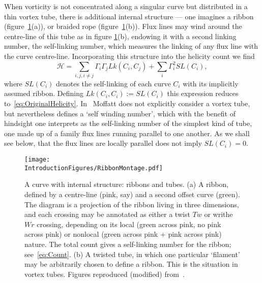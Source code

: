 When vorticity is not concentrated along a singular curve but distributed in a thin vortex tube, there is additional internal structure --- one imagines a ribbon (figure~\ref{fig:RibbonMontage}(a)), or braided rope (figure~\ref{fig:RibbonMontage}(b)). Flux lines may wind around the centre-line of this tube as in figure \ref{fig:RibbonMontage}(b), endowing it with a second linking number, the self-linking number, which measures the linking of any flux line with the curve centre-line. Incorporating this structure into the helicity count we find \citep{Moffat1992}
\begin{equation}
    \mathcal{H} = \sum_{i,j, i\neq j}\Gamma_i \Gamma_j  Lk(C_i,C_j) + \sum_{i} \Gamma_i^2 SL(C_i), 
    \label{eq:HelicityCount}
\end{equation}
where $SL(C_i)$ denotes the self-linking of each curve $C_i$ with its implicitly assumed ribbon. Defining $Lk(C_i,C_i) := SL(C_i)$ this expression reduces to~\eqref{eq:OriginalHelicity}. In~\citep{Moffatt1969} Moffatt does not explicitly consider a vortex tube, but nevertheless defines a `self winding number', which with the benefit of hindsight one interprets as the self-linking number of the simplest kind of tube, one made up of a family flux lines running parallel to one another. As we shall see below, that the flux lines are locally parallel does not imply $SL(C_i) = 0$.
\begin{figure}[htbp]
\centering
\texttt{[image: \\IntroductionFigures/RibbonMontage.pdf]}
\caption[Twist and writhe.]{A curve with internal structure: ribbons and tubes. (a) A ribbon, defined by a centre-line (pink, say) and a second offset curve (green). The diagram is a projection of the ribbon living in three dimensions, and each crossing may be annotated as either a twist $Tw$ or writhe $Wr$ crossing, depending on its local (green across pink, no pink across pink) or nonlocal (green across pink + pink across pink) nature. The total count gives a self-linking number for the ribbon; see~\eqref{eq:Count}. (b) A twisted tube, in which one particular `filament' may be arbitrarily chosen to define a ribbon. This is the situation in vortex tubes. Figures reproduced (modified) from~\citep{Dennis2005,Moffat1992}.}
\label{fig:RibbonMontage}
\end{figure}
